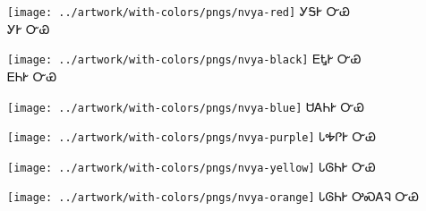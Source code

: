 \documentclass[avery5371]{flashcards}%
\begin{document}
    \begin{flashcard}{
        \texttt{[image: ../artwork/with-colors/pngs/nvya-red]}
    }
        \Huge ᎩᎦᎨ ᏅᏯ\\ᎩᎨ ᏅᏯ
    \end{flashcard}

    \begin{flashcard}{
        \texttt{[image: ../artwork/with-colors/pngs/nvya-black]}
    }
        \Huge ᎬᎿᎨ ᏅᏯ\\ᎬᏂᎨ ᏅᏯ
    \end{flashcard}

    \begin{flashcard}{
        \texttt{[image: ../artwork/with-colors/pngs/nvya-blue]}
    }
        \Huge ᏌᎪᏂᎨ ᏅᏯ
    \end{flashcard}

    \begin{flashcard}{
        \texttt{[image: ../artwork/with-colors/pngs/nvya-purple]}
    }
        \Huge ᏓᎭᎵᎨ ᏅᏯ
    \end{flashcard}


    \begin{flashcard}{
        \texttt{[image: ../artwork/with-colors/pngs/nvya-yellow]}
    }
        \Huge ᏓᎶᏂᎨ ᏅᏯ
    \end{flashcard}

    \begin{flashcard}{
        \texttt{[image: ../artwork/with-colors/pngs/nvya-orange]}
    }
        \Huge ᏓᎶᏂᎨ ᎤᏍᎪᎸ ᏅᏯ
    \end{flashcard}
\end{document}
